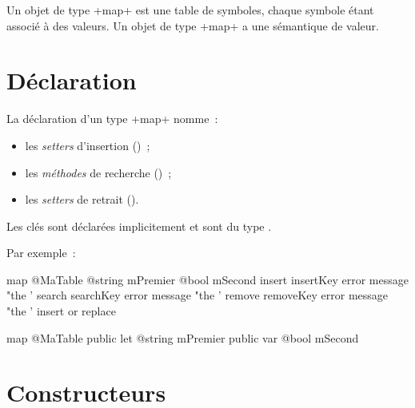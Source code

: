 



Un objet de type \ggst+map+ est une table de symboles, chaque symbole étant associé à des valeurs. Un objet de type \ggst+map+ a une sémantique de valeur.

\section{Déclaration}

La déclaration d'un type \ggst+map+ nomme~:
\begin{itemize}
  \item les \emph{setters} d'insertion ()~;
  \item les \emph{méthodes} de recherche ()~;
  \item les \emph{setters} de retrait ().
\end{itemize}

Les clés sont déclarées implicitement et sont du type .

Par exemple~:

\begin{galgas3}
map @MaTable {
  @string mPremier
  @bool mSecond
  insert insertKey error message "the '%
  search searchKey error message "the '%
  remove removeKey error message "the '%
  insert or replace
}
\end{galgas3}


\begin{galgas4}
map @MaTable {
  public let @string mPremier
  public var @bool mSecond
}
\end{galgas4}







\section{Constructeurs}

